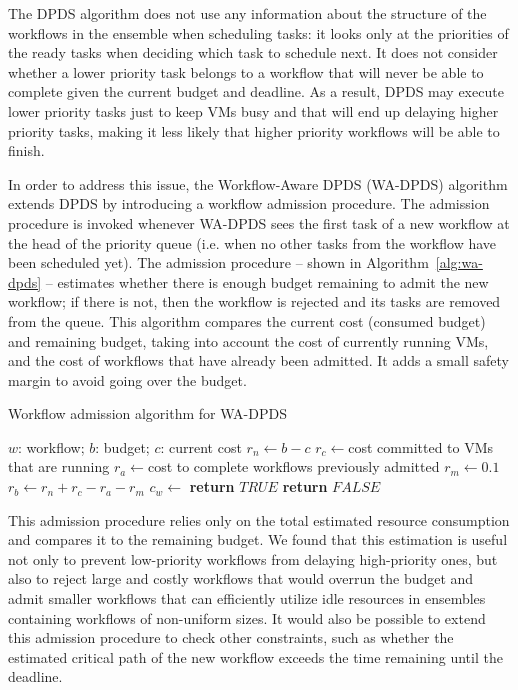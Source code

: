 \documentclass{sig-alternate}
\begin{document}
The DPDS algorithm does not use any information about the structure of the workflows
in the ensemble when scheduling tasks: it looks only at the priorities of the ready 
tasks when deciding which task to schedule next. It does not consider whether a lower 
priority task belongs to a workflow that will never be able to complete given the 
current budget and deadline. As a result, DPDS may execute lower priority tasks just 
to keep VMs busy and that will end up delaying higher priority tasks, making it less likely
that higher priority workflows will be able to finish.

In order to address this issue, the Workflow-Aware DPDS (WA-DPDS) algorithm extends 
DPDS by introducing a workflow admission procedure. The admission procedure is
invoked whenever WA-DPDS sees the first task of a new workflow at the head of the 
priority queue (i.e. when no other tasks from the workflow have been scheduled yet). 
The admission procedure -- shown in Algorithm~\ref{alg:wa-dpds} -- estimates
whether there is enough budget remaining to admit the new workflow; if there is not, then the 
workflow is rejected and its tasks are removed from the queue. This algorithm 
compares the current cost (consumed budget) and remaining budget, taking
into account the cost of currently running VMs, and the cost of workflows 
that have already been admitted. It adds a small safety margin to  avoid going over
the budget.

\begin{algorithm}[tb]
\caption{Workflow admission algorithm for WA-DPDS}
\label{alg:wa-dpds}
\begin{algorithmic}[1]
\Require $w$: workflow; $b$: budget; $c$: current cost
    \State $r_n\gets b-c$ 
    \State $r_c\gets $cost committed to VMs that are running
    \State $r_a\gets $cost to complete workflows previously admitted
	\State $r_m\gets 0.1$ 
	\State $r_b\gets r_n+r_c-r_a-r_m$ 
	\State $c_w\gets$ 
    	\State \textbf{return} $TRUE$
    \Else
    	\State \textbf{return} $FALSE$
	\EndIf    	 
\EndProcedure
\end{algorithmic} 
\end{algorithm}


This admission procedure relies only on the total estimated resource consumption and
compares it to the remaining budget. We found that this estimation is useful not
only to prevent low-priority workflows from delaying high-priority ones, but
also to reject large and costly workflows that would overrun the budget and
admit smaller workflows that can efficiently utilize idle resources in ensembles 
containing workflows of non-uniform sizes. It would also be possible to extend this 
admission procedure to check other constraints, such as whether the estimated 
critical path of the new workflow exceeds the time remaining until the deadline.
\end{document}
